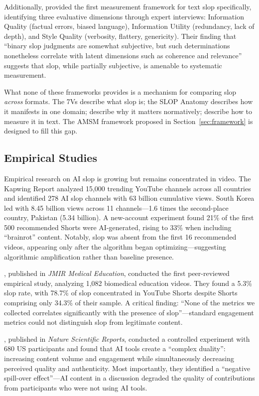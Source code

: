 \documentclass[12pt,a4paper]{article}
\begin{document}
Additionally, \textcite{Shaib2025} provided the first measurement framework for text slop specifically, identifying three evaluative dimensions through expert interviews: Information Quality (factual errors, biased language), Information Utility (redundancy, lack of depth), and Style Quality (verbosity, flattery, genericity). Their finding that ``binary slop judgments are somewhat subjective, but such determinations nonetheless correlate with latent dimensions such as coherence and relevance'' suggests that slop, while partially subjective, is amenable to systematic measurement.

What none of these frameworks provides is a mechanism for comparing slop \emph{across} formats. The 7Vs describe what slop is; the SLOP Anatomy describes how it manifests in one domain; \textcite{Kommers2025} describe why it matters normatively; \textcite{Shaib2025} describe how to measure it in text. The AMSM framework proposed in Section~\ref{sec:framework} is designed to fill this gap.

\subsection{Empirical Studies}

Empirical research on AI slop is growing but remains concentrated in video. The Kapwing Report \parencite{Kapwing2025} analyzed 15,000 trending YouTube channels across all countries and identified 278 AI slop channels with 63 billion cumulative views. South Korea led with 8.45 billion views across 11 channels---1.6 times the second-place country, Pakistan (5.34 billion). A new-account experiment found 21\% of the first 500 recommended Shorts were AI-generated, rising to 33\% when including ``brainrot'' content. Notably, slop was absent from the first 16 recommended videos, appearing only after the algorithm began optimizing---suggesting algorithmic amplification rather than baseline presence.

\textcite{Jones2025}, published in \textit{JMIR Medical Education}, conducted the first peer-reviewed empirical study, analyzing 1,082 biomedical education videos. They found a 5.3\% slop rate, with 78.7\% of slop concentrated in YouTube Shorts despite Shorts comprising only 34.3\% of their sample. A critical finding: ``None of the metrics we collected correlates significantly with the presence of slop''---standard engagement metrics could not distinguish slop from legitimate content.

\textcite{Moller2026}, published in \textit{Nature Scientific Reports}, conducted a controlled experiment with 680 US participants and found that AI tools create a ``complex duality'': increasing content volume and engagement while simultaneously decreasing perceived quality and authenticity. Most importantly, they identified a ``negative spill-over effect''---AI content in a discussion degraded the quality of contributions from participants who were not using AI tools.
\end{document}
